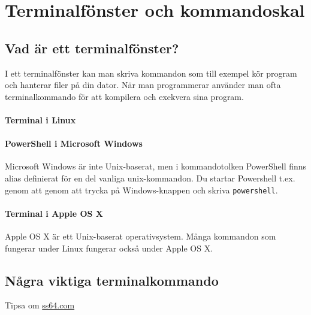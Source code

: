
\chapter{Terminalfönster och kommandoskal}

\section{Vad är ett terminalfönster?}

I ett terminalfönster kan man skriva kommandon som till exempel kör program och hanterar filer på din dator. När man programmerar använder man ofta terminalkommando för att kompilera och exekvera sina program.   
 
\subsubsection{Terminal i Linux}

\subsubsection{PowerShell i Microsoft Windows}
Microsoft Windows är inte Unix-baserat, men i kommandotolken PowerShell finns alias definierat för en del vanliga unix-kommandon. Du startar Powershell t.ex. genom att genom att trycka på Windows-knappen och skriva \texttt{powershell}.

\subsubsection{Terminal i Apple OS X}
Apple OS X är ett Unix-baserat operativsystem. Många kommandon som fungerar under Linux fungerar också under Apple OS X.

\section{Några viktiga terminalkommando}

Tipsa om \href{http://ss64.com/}{ss64.com}